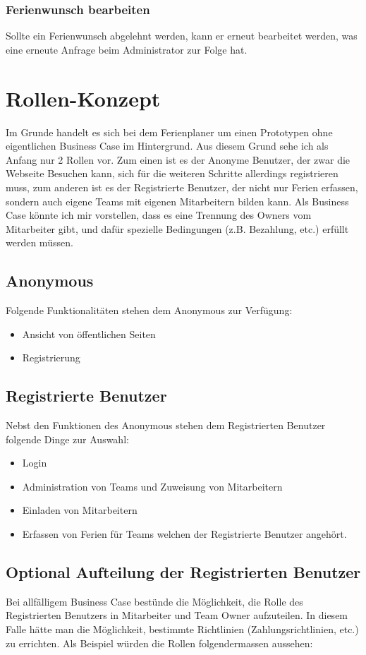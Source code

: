\subsubsection{Ferienwunsch bearbeiten}
Sollte ein Ferienwunsch abgelehnt werden, kann er erneut bearbeitet werden, was eine erneute Anfrage beim Administrator zur Folge hat.

\section{Rollen-Konzept}\label{konzept:rollen}
Im Grunde handelt es sich bei dem Ferienplaner um einen Prototypen ohne eigentlichen Business Case im Hintergrund. Aus diesem Grund sehe ich als Anfang nur 2 Rollen vor. Zum einen ist es der Anonyme Benutzer, der zwar die Webseite Besuchen kann, sich f\"ur die weiteren Schritte allerdings registrieren muss, zum anderen ist es der Registrierte Benutzer, der nicht nur Ferien erfassen, sondern auch eigene Teams mit eigenen Mitarbeitern bilden kann. Als Business Case k\"onnte ich mir vorstellen, dass es eine Trennung des Owners vom Mitarbeiter gibt, und daf\"ur spezielle Bedingungen (z.B. Bezahlung, etc.) erf\"ullt werden m\"ussen.
\subsection{Anonymous}
Folgende Funktionalit\"aten stehen dem Anonymous zur Verf\"ugung:
\begin{itemize}
\item Ansicht von \"offentlichen Seiten
\item Registrierung
\end{itemize}

\subsection{Registrierte Benutzer}
Nebst den Funktionen des Anonymous stehen dem Registrierten Benutzer folgende Dinge zur Auswahl:
\begin{itemize}
\item Login
\item Administration von Teams und Zuweisung von Mitarbeitern
\item Einladen von Mitarbeitern
\item Erfassen von Ferien f\"ur Teams welchen der Registrierte Benutzer angeh\"ort.
\end{itemize}

\subsection{Optional Aufteilung der Registrierten Benutzer}
Bei allf\"alligem Business Case best\"unde die M\"oglichkeit, die Rolle des Registrierten Benutzers in Mitarbeiter und Team Owner aufzuteilen. In diesem Falle h\"atte man die M\"oglichkeit, bestimmte Richtlinien (Zahlungsrichtlinien, etc.) zu errichten. Als Beispiel w\"urden die Rollen folgendermassen aussehen:
